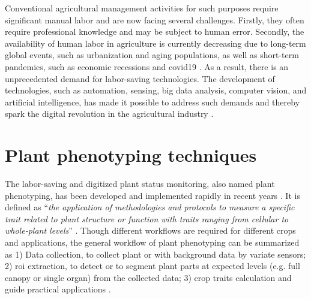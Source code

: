 
Conventional agricultural management activities for such purposes require significant manual labor and are now facing several challenges. Firstly, they often require professional knowledge and may be subject to human error. Secondly, the availability of human labor in agriculture is currently decreasing due to long-term global events, such as urbanization and aging populations, as well as short-term pandemics, such as economic recessions and \gls{covid19} \citep{gallardo_adoption_2018, larue_labor_2020}. As a result, there is an unprecedented demand for labor-saving technologies. The development of technologies, such as automation, sensing, big data analysis, computer vision, and artificial intelligence, has made it possible to address such demands and thereby spark the digital revolution in the agricultural industry \citep{gallardo_adoption_2018}.

\section{Plant phenotyping techniques}
The labor-saving and digitized plant status monitoring, also named plant phenotyping, has been developed and implemented rapidly in recent years \citep{araus_field_2014}. It is defined as ``\textit{the application of methodologies and protocols to measure a specific trait related to plant structure or function with traits ranging from cellular to whole-plant levels}'' \citep{fiorani_future_2013, ghanem_physiological_2015}. Though different workflows are required for different crops and applications, the general workflow of plant phenotyping can be summarized as 1) Data collection, to collect plant or with background data by variate sensors; 2) \gls{roi} extraction, to detect or to segment plant parts at expected levels (e.g. full canopy or single organ) from the collected data; 3) crop traits calculation and guide practical applications \citep{zhao_crop_2019}.

